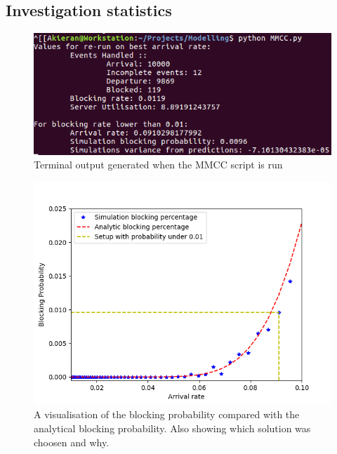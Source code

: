 \documentclass{ecmm427_assignment}
\begin{document}
\subsection{Investigation statistics}

\begin{figure}[H]
 \centering
\includegraphics[scale=0.65]{MMCCOutput.png}
\caption{Terminal output generated when the MMCC script is run}
\end{figure}

\begin{figure}[H]
 \centering
\includegraphics[scale=0.65]{MMCCBlockingProb.png}
\caption{A visualisation of the blocking probability compared with the analytical blocking probability. Also showing which solution was choosen and why.}
\end{figure}
\end{document}
